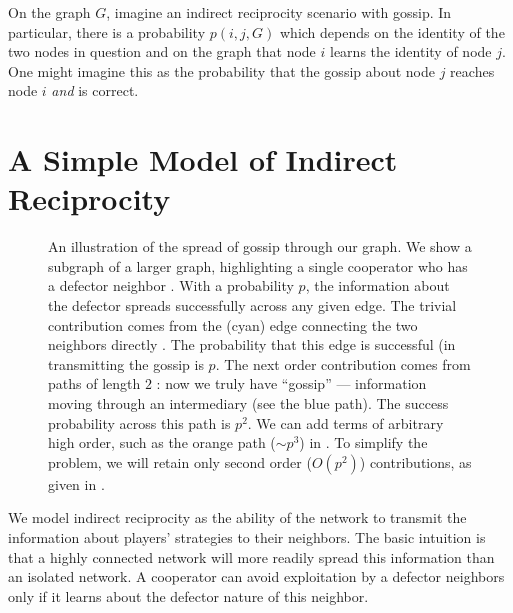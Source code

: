 \documentclass{article}
\renewcommand{\=}[1]{\stackrel{#1}{=}} %
\begin{document}
    On the graph $G$, imagine an indirect reciprocity scenario with gossip.
In particular, there is a probability $p(i,j,G)$ which depends on the
identity of the two nodes in question and on the graph that node $i$
learns the identity of node $j$. One might imagine this as the
probability that the gossip about node $j$ reaches node $i$ \emph{and}
is correct.


\section{A Simple Model of Indirect Reciprocity}

\begin{figure}
\noindent{}
\noindent{}
\caption{An illustration of the spread of gossip through our graph. We show a subgraph of a larger graph, highlighting a single cooperator who has a defector neighbor \protect{}. With a probability $p$, the information about the defector spreads successfully across any given edge. The trivial contribution comes from the (cyan) edge connecting the two neighbors directly \protect{}. The probability that this edge is successful (in transmitting the gossip is $p$. The next order contribution comes from paths of length $2$ \protect{}: now we truly have ``gossip'' --- information moving through an intermediary (see the blue path). The success probability across this path is $p^2$. We can add terms of arbitrary high order, such as the orange path ($\sim p^3$) in \protect{}. To simplify the problem, we will retain only second order ($O(p^2)$) contributions, as given in \protect{}.}
  \label{fig:gossip}
\end{figure}




We model indirect reciprocity as the ability of the network to transmit the information about players' strategies to their neighbors. The basic intuition is that a highly connected network will more readily spread this information than an isolated network. A cooperator can avoid exploitation by a defector neighbors only if it learns about the defector nature of this neighbor.
\end{document}
